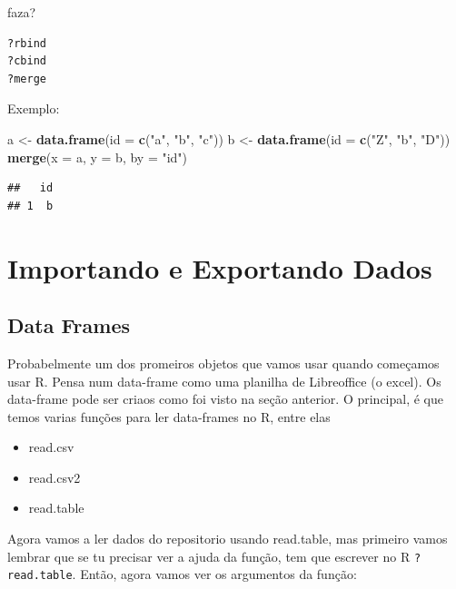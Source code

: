 \documentclass[]{book}
\newenvironment{Shaded}{\begin{snugshade}}{\end{snugshade}}
\newcommand{\KeywordTok}[1]{\textcolor[rgb]{0.13,0.29,0.53}{\textbf{#1}}}
\newcommand{\DataTypeTok}[1]{\textcolor[rgb]{0.13,0.29,0.53}{#1}}
\newcommand{\StringTok}[1]{\textcolor[rgb]{0.31,0.60,0.02}{#1}}
\newcommand{\NormalTok}[1]{#1}
\providecommand{\tightlist}{%
  \setlength{\itemsep}{0pt}\setlength{\parskip}{0pt}}
\theoremstyle{definition}
\theoremstyle{definition}
\theoremstyle{definition}
\theoremstyle{remark}
\begin{document}
faza?

\begin{verbatim}
?rbind
?cbind
?merge
\end{verbatim}

Exemplo:

\begin{Shaded}
\begin{Highlighting}[]
\NormalTok{a <-}\StringTok{ }\KeywordTok{data.frame}\NormalTok{(}\DataTypeTok{id =} \KeywordTok{c}\NormalTok{(}\StringTok{"a"}\NormalTok{, }\StringTok{"b"}\NormalTok{, }\StringTok{"c"}\NormalTok{))}
\NormalTok{b <-}\StringTok{ }\KeywordTok{data.frame}\NormalTok{(}\DataTypeTok{id =} \KeywordTok{c}\NormalTok{(}\StringTok{"Z"}\NormalTok{, }\StringTok{"b"}\NormalTok{, }\StringTok{"D"}\NormalTok{))}
\KeywordTok{merge}\NormalTok{(}\DataTypeTok{x =}\NormalTok{ a, }\DataTypeTok{y =}\NormalTok{ b, }\DataTypeTok{by =} \StringTok{"id"}\NormalTok{) }
\end{Highlighting}
\end{Shaded}

\begin{verbatim}
##   id
## 1  b
\end{verbatim}

\chapter{Importando e Exportando
Dados}\label{importando-e-exportando-dados}

\section{Data Frames}\label{data-frames}

Probabelmente um dos promeiros objetos que vamos usar quando começamos
usar R. Pensa num data-frame como uma planilha de Libreoffice (o excel).
Os data-frame pode ser criaos como foi visto na seção anterior. O
principal, é que temos varias funções para ler data-frames no R, entre
elas

\begin{itemize}
\tightlist
\item
  read.csv
\item
  read.csv2
\item
  read.table
\end{itemize}

Agora vamos a ler dados do repositorio usando read.table, mas primeiro
vamos lembrar que se tu precisar ver a ajuda da função, tem que escrever
no R \texttt{?read.table}. Então, agora vamos ver os argumentos da
função:
\end{document}
